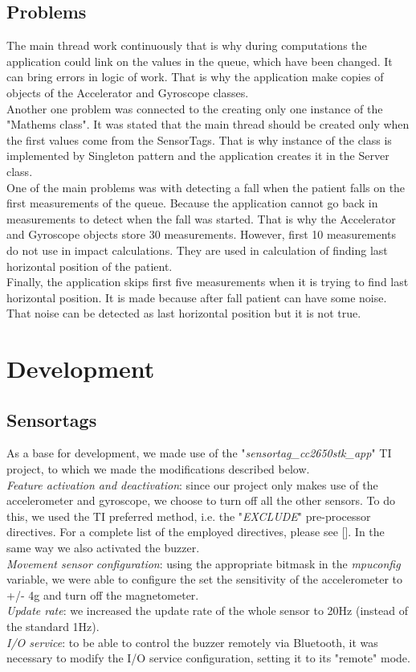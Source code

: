 \documentclass[hidelinks,conference,12pt]{IEEETran}
\begin{document}
\subsection{Problems}
The main thread work continuously that is why during computations the application could link on the values in the queue, which have been changed. It can bring errors in logic of work. That is why the application make copies of objects of the Accelerator and Gyroscope classes.\\
Another one problem was connected to the creating only one instance of the "Mathems class". It was stated that the main thread should be created only when the first values come from the SensorTags. That is why instance of the class is implemented by Singleton pattern and the application creates it in the Server class.\\
One of the main problems was with detecting a fall when the patient falls on the first measurements of the queue. Because the application cannot go back in measurements to detect when the fall was started. That is why the Accelerator and Gyroscope objects store 30 measurements. However, first 10 measurements do not use in impact calculations. They are used in calculation of finding last horizontal position of the patient.\\
Finally, the application skips first five measurements when it is trying to find last horizontal position. It is made because after fall patient can have some noise. That noise can be detected as last horizontal position but it is not true.

\section{Development}
\subsection{Sensortags}
As a base for development, we made use of the "\textit{sensortag\_cc2650stk\_app}" TI project, to which we made the modifications described below.\\
\textit{Feature activation and deactivation}: since our project only makes use of the accelerometer and gyroscope, we choose to turn off all the other sensors. To do this, we used the TI preferred method, i.e. the "\textit{EXCLUDE}" pre-processor directives. For a complete list of the employed directives, please see []. In the same way we also activated the buzzer.\\
\textit{Movement sensor configuration}: using the appropriate bitmask in the \textit{mpuconfig} variable, we were able to configure the set the sensitivity of the accelerometer to +/- 4g and turn off the magnetometer.\\
\textit{Update rate}: we increased the update rate of the whole sensor to 20Hz (instead of the standard 1Hz).\\
\textit{I/O service}: to be able to control the buzzer remotely via Bluetooth, it was necessary to modify the I/O service configuration, setting it to its "remote" mode.
\end{document}
